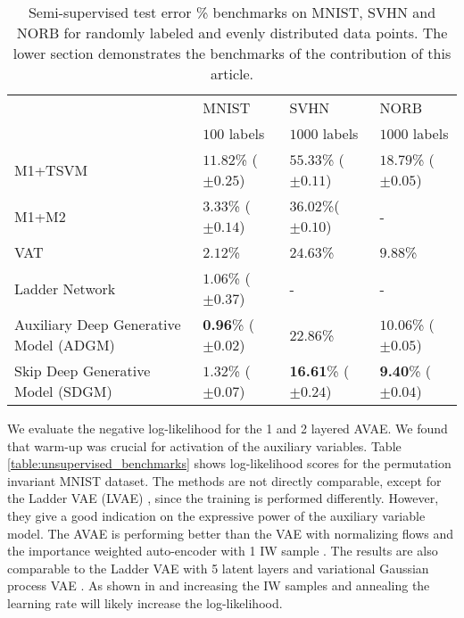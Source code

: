 \documentclass{article}
\begin{document}
\begin{table*}
\begin{center}
\begin{small}
\begin{sc}
\begin{tabular}{l|lll}
\hline
\abovespace\
  & MNIST   & SVHN & NORB \\   
  & $100$ labels & $1000$ labels & $1000$ labels \\
\hline
\abovespace 
M1+TSVM \citep{Kingma14}& $11.82$\% ($\pm 0.25$) & $55.33$\% ($\pm 0.11$) & $18.79$\% ($\pm 0.05$)  \\ 
M1+M2 \citep{Kingma14} & $3.33$\% ($\pm 0.14$) &$36.02$\%($\pm0.10$) & - \\
VAT \citep{Miyato15} & $2.12$\% & $24.63$\% & $9.88$\% \\
Ladder Network \citep{Rasmus15}& $1.06$\% ($\pm 0.37$) & - & - \\ 
 \hline
 \abovespace 
 Auxiliary Deep Generative Model (ADGM) & \textbf{0.96}\% ($\pm 0.02$) & $22.86$\% & $10.06$\% ($\pm 0.05$) \\
 Skip Deep Generative Model (SDGM) & $1.32$\% ($\pm 0.07$) & \textbf{16.61}\% ($\pm 0.24$) & \textbf{9.40}\% ($\pm 0.04$) \\
\hline
\end{tabular}\end{sc}
\end{small}
\end{center}
\vskip -0.1in
\caption{Semi-supervised test error \% benchmarks on MNIST, SVHN and NORB for randomly labeled and evenly distributed data points. The lower section demonstrates the benchmarks of the contribution of this article.}\label{table:benchmarks}
\vspace{-2mm}
\end{table*}

We evaluate the negative log-likelihood for the 1 and 2 layered AVAE. We found that warm-up was crucial for activation of the auxiliary variables. Table \ref{table:unsupervised_benchmarks} shows log-likelihood scores for the permutation invariant MNIST dataset. The methods are not directly comparable, except for the Ladder VAE (LVAE) \citep{Sonderby2016}, since the training is performed differently. However, they give a good indication on the expressive power of the auxiliary variable model. The AVAE is performing better than the VAE with normalizing flows \citep{Rezende2015} and the importance weighted auto-encoder with 1 IW sample \citep{Burda15}. The results are also comparable to the Ladder VAE with 5 latent layers \citep{Sonderby2016} and variational Gaussian process VAE \citep{Tran2015}. As shown in \citet{Burda15} and \citet{Sonderby2016} increasing the IW samples and annealing the learning rate will likely increase the log-likelihood.
\end{document}
